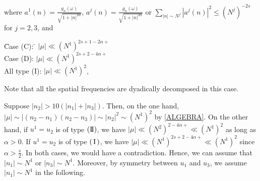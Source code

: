 \documentclass[11pt]{amsart}
\numberwithin{equation}{section} \numberwithin{theorem}{section}
\begin{document}
{
\noindent} where $a^1(n) = \frac{g_n(\omega)}{\sqrt{1 + |n|^{2{\alpha}}}}$, 
$a^j(n) = \frac{g_n(\omega)}{\sqrt{1 + |n|^{2{\alpha}}}}$ or $\sum_{|n| \sim N^j} |a^j(n)|^2 \leq (N^j)^{-2s}$ for $j = 2, 3$, and 
\begin{tabbing}
	\hspace{1cm} \= Case (C): \hspace{5mm} \= $|\mu| \ll (N^1)^{2s + 1 - 2 {\alpha}+}$ \\
	\> Case (D): \> $|\mu| \ll (N^1)^{2s + 2 - 4 {\alpha}+}$ \\
	\> All type (I): \> $|\mu| \ll (N^1)^2$, 
\end{tabbing}

{
\noindent} Note that all the spatial frequencies are dyadically decomposed in this case.

\medskip

Suppose $|n_2| > 10 (|n_1| + |n_3|)$. Then, on the one hand, $|\mu| \sim |(n_2 - n_1) (n_2 - n_3)| \sim |n_2|^2 \sim (N^1)^2$ by \eqref{ALGEBRA}. 
On the other hand, if $u^1 = u_2$ is of type $({\text{I \hspace{-2.8mm} I} })$, we have $|\mu| \ll (N^2)^{2- 4{\alpha}+} \ll (N^1)^2$ as long as ${\alpha} > 0$. If $u^1 = u_2$ is of type $({\hspace{0.5mm}\text{I}\hspace{0.5mm}})$, we have $|\mu| \ll (N^1)^{2s + 2 - 4{\alpha}+} \ll (N^1)^2$ since ${\alpha} > \frac{s}{2}$. In both cases, we would have a contradiction. Hence, we can assume that $|n_1| \sim N^1$ or $|n_3| \sim N^1$. Moreover, by symmetry between $u_1$ and $u_3$, we assume $|n_1| \sim N^1$ in the following.
\end{document}

